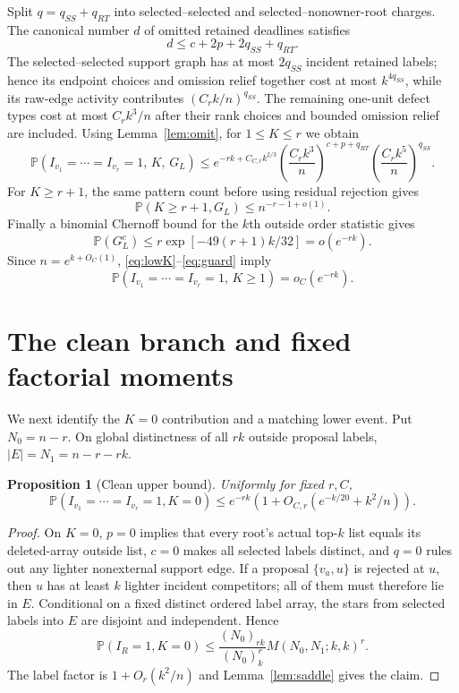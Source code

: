 \documentclass[11pt]{article}
\newtheorem{proposition}[theorem]{Proposition}
\newcommand{\Pp}{\mathbb P}
\newcommand{\1}{\mathbf 1}
\begin{document}
Split $q=q_{SS}+q_{RT}$ into selected--selected and selected--nonowner-root charges.
The canonical number $d$ of omitted retained deadlines satisfies
\begin{equation}\label{eq:omissions}
 d\le c+2p+2q_{SS}+q_{RT}.
\end{equation}
The selected--selected support graph has at most $2q_{SS}$ incident retained labels; hence
its endpoint choices and omission relief together cost at most $k^{4q_{SS}}$, while its
raw-edge activity contributes $(C_rk/n)^{q_{SS}}$.  The remaining one-unit defect types
cost at most $C_rk^3/n$ after their rank choices and bounded omission relief are included.
Using Lemma~\ref{lem:omit}, for $1\le K\le r$ we obtain
\begin{equation}\label{eq:lowK}
 \Pp(I_{v_1}=\cdots=I_{v_r}=1,\,K,\,G_L)
 \le e^{-rk+C_{C,r}k^{2/3}}
 \left(\frac{C_rk^3}{n}\right)^{c+p+q_{RT}}
 \left(\frac{C_rk^5}{n}\right)^{q_{SS}}.
\end{equation}
For $K\ge r+1$, the same pattern count before using residual rejection gives
\begin{equation}\label{eq:highK}
 \Pp(K\ge r+1,G_L)\le n^{-r-1+o(1)}.
\end{equation}
Finally a binomial Chernoff bound for the $k$th outside order statistic gives
\begin{equation}\label{eq:guard}
 \Pp(G_L^c)\le r\exp[-49(r+1)k/32]=o(e^{-rk}).
\end{equation}
Since $n=e^{k+O_C(1)}$, \eqref{eq:lowK}--\eqref{eq:guard} imply
\begin{equation}\label{eq:positiveK}
 \Pp(I_{v_1}=\cdots=I_{v_r}=1,\,K\ge1)=o_C(e^{-rk}).
\end{equation}

\section{The clean branch and fixed factorial moments}

We next identify the $K=0$ contribution and a matching lower event.
Put $N_0=n-r$.  On global distinctness of all $rk$ outside proposal labels,
$|E|=N_1=n-r-rk$.

\begin{proposition}[Clean upper bound]\label{prop:clean-upper}
Uniformly for fixed $r,C$,
\[
 \Pp(I_{v_1}=\cdots=I_{v_r}=1,K=0)
 \le e^{-rk}\left(1+O_{C,r}(e^{-k/20}+k^2/n)\right).
\]
\end{proposition}

\begin{proof}
On $K=0$, $p=0$ implies that every root's actual top-$k$ list equals its deleted-array
outside list, $c=0$ makes all selected labels distinct, and $q=0$ rules out any lighter
nonexternal support edge.  If a proposal $\{v_a,u\}$ is rejected at $u$, then $u$ has at
least $k$ lighter incident competitors; all of them must therefore lie in $E$.
Conditional on a fixed distinct ordered label array, the stars from selected labels into
$E$ are disjoint and independent.  Hence
\[
 \Pp(I_R=1,K=0)
 \le \frac{(N_0)_{rk}}{(N_0)_k^r}
       M(N_0,N_1;k,k)^r.
\]
The label factor is $1+O_r(k^2/n)$ and Lemma~\ref{lem:saddle} gives the claim.
\end{proof}
\end{document}
